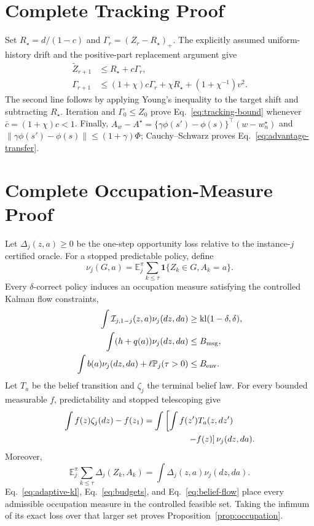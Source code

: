 \documentclass[journal]{IEEEtran}
\newcommand{\E}{\mathbb E}
\newcommand{\Pp}{\mathbb P}
\begin{document}
\section{Complete Tracking Proof}
Set $R_\star=d/(1-c)$ and $\Gamma_r=(Z_r-R_\star)_+$.
The explicitly assumed uniform-history drift and the positive-part replacement argument give
\begin{align}
\widetilde Z_{r+1}
&\le R_\star+c\Gamma_r,\nonumber\\
\Gamma_{r+1}
&\le(1+\chi)c\Gamma_r+\chi R_\star+(1+\chi^{-1})v^2.
\label{eq:tracking-old-target}
\end{align}
The second line follows by applying Young's inequality to the target shift and subtracting $R_\star$.
Iteration and $\Gamma_0\le Z_0$ prove Eq.~\eqref{eq:tracking-bound} whenever $\bar c=(1+\chi)c<1$.
Finally, $\widehat A_w-A^\star=\{\gamma\phi(s')-\phi(s)\}^\top(w-w_n^\star)$ and $\|\gamma\phi(s')-\phi(s)\|\le(1+\gamma)\Phi$; Cauchy--Schwarz proves Eq.~\eqref{eq:advantage-transfer}.

\section{Complete Occupation-Measure Proof}
Let $\Delta_j(z,a)\ge0$ be the one-step opportunity loss relative to the instance-$j$ certified oracle.
For a stopped predictable policy, define
\begin{equation}
\nu_j(G,a)=\E_j^\pi\sum_{k\le\tau}\mathbf{1}\{Z_k\in G,A_k=a\}.
\end{equation}
Every $\delta$-correct policy induces an occupation measure satisfying the controlled Kalman flow constraints,
\begin{align}
\int\mathcal{I}_{j,1-j}(z,a)\nu_j(dz,da)&\ge\operatorname{kl}(1-\delta,\delta),\nonumber\\
\int(h+q(a))\nu_j(dz,da)&\le B_{\rm msg},\nonumber\\
\int b(a)\nu_j(dz,da)+\ell\Pp_j(\tau>0)&\le B_{\rm env}.
\end{align}
Let $T_a$ be the belief transition and $\zeta_j$ the terminal belief law.
For every bounded measurable $f$, predictability and stopped telescoping give
\begin{align}
\int f(z)\zeta_j(dz)-f(z_1)
&=\int\left[\int f(z')T_a(z,dz')\right.\nonumber\\
&\left.\hspace{18mm}-f(z)\right]\nu_j(dz,da).
\label{eq:belief-flow}
\end{align}
Moreover,
\begin{equation}
\E_j^\pi\sum_{k\le\tau}\Delta_j(Z_k,A_k)
=\int\Delta_j(z,a)\nu_j(dz,da).
\end{equation}
Eq.~\eqref{eq:adaptive-kl}, Eq.~\eqref{eq:budgets}, and Eq.~\eqref{eq:belief-flow} place every admissible occupation measure in the controlled feasible set.
Taking the infimum of its exact loss over that larger set proves Proposition~\ref{prop:occupation}.
\end{document}
